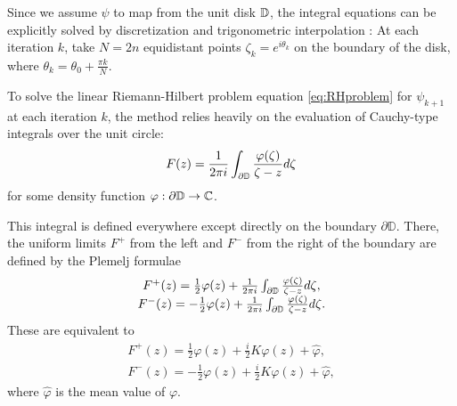 Since we assume $\psi$ to map from the unit disk $\mathbb{D}$, the integral equations can be explicitly solved by discretization and trigonometric interpolation \cite[§5]{Wegmann1978_newtonverfahren}:
At each iteration $k$, take $N=2n$ equidistant points $\zeta_k=e^{i\theta_k}$ on the boundary of the disk, where $\theta_k = \theta_0 + \frac{\pi k}{N}$.

To solve the linear Riemann-Hilbert problem equation \ref{eq:RHproblem} for $\psi_{k+1}$ at each iteration $k$, the method relies heavily on the evaluation of Cauchy-type integrals over the unit circle:
\begin{equation}
    F(z)= \frac{1}{2\pi i} \displaystyle \int_{\partial\mathbb{D}} \frac{\varphi(\zeta)}{\zeta - z} d\zeta
\end{equation}
for some density function $\varphi:\partial\mathbb{D}\to\mathbb{C}$.

This integral is defined everywhere except directly on the boundary $\partial\mathbb{D}$. 
There, the uniform limits $F^+$ from the left and $F^-$ from the right of the boundary are defined by the Plemelj formulae \cite[Eq. 17.2]{Muskhelishvili1977}
\begin{equation}
    \begin{matrix}
        F^+(z) = \frac{1}{2} \varphi(z) + \frac{1}{2\pi i} \int_{\partial\mathbb{D}} \frac{\varphi(\zeta)}{\zeta - z} d\zeta, \\
        F^-(z) = -\frac{1}{2} \varphi(z) +\frac{1}{2\pi i} \int_{\partial\mathbb{D}} \frac{\varphi(\zeta)}{\zeta - z} d\zeta.
    \end{matrix}
\end{equation}
These are equivalent to \cite[Lemma 14.2e]{Henrici1986_vol3}
\begin{equation}
    \begin{matrix} \label{eq:F+Hilbert}
        F^+(z) = \frac{1}{2}\varphi(z) + \frac{i}{2} K \varphi(z) + \hat\varphi, \\
        F^-(z) = - \frac{1}{2}\varphi(z) + \frac{i}{2} K \varphi(z) + \hat\varphi,
    \end{matrix}
\end{equation} where $\hat\varphi$ is the mean value of $\varphi$.

